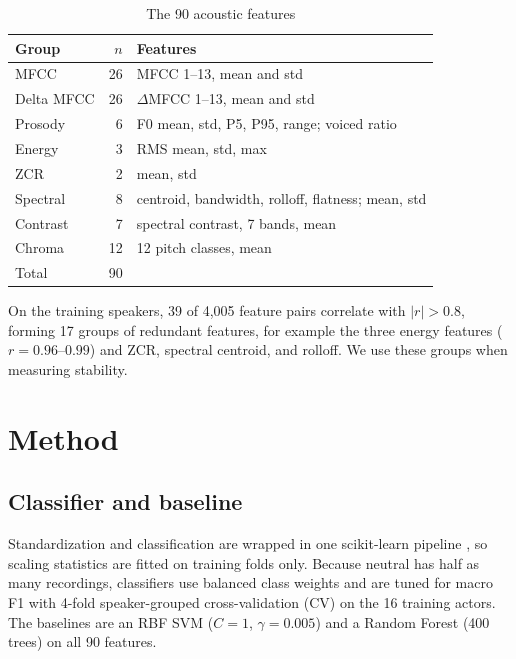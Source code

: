 \documentclass[conference]{IEEEtran}
\begin{document}
\begin{table}[t]
\caption{The 90 acoustic features}
\label{tab:features}
\centering
\small
\begin{tabular}{@{}lrl@{}}
\toprule
Group & $n$ & Features \\
\midrule
MFCC & 26 & MFCC 1--13, mean and std \\
Delta MFCC & 26 & $\Delta$MFCC 1--13, mean and std \\
Prosody & 6 & F0 mean, std, P5, P95, range; voiced ratio \\
Energy & 3 & RMS mean, std, max \\
ZCR & 2 & mean, std \\
Spectral & 8 & centroid, bandwidth, rolloff, flatness; mean, std \\
Contrast & 7 & spectral contrast, 7 bands, mean \\
Chroma & 12 & 12 pitch classes, mean \\
\midrule
Total & 90 & \\
\bottomrule
\end{tabular}
\end{table}

On the training speakers, 39 of 4{,}005 feature pairs correlate with $|r|>0.8$, forming 17
groups of redundant features, for example the three energy features ($r=0.96$--$0.99$) and ZCR,
spectral centroid, and rolloff. We use these groups when measuring stability.

\section{Method}

\subsection{Classifier and baseline}
Standardization and classification are wrapped in one scikit-learn pipeline
\cite{pedregosa2011sklearn}, so scaling statistics are fitted on training folds only. Because
neutral has half as many recordings, classifiers use balanced class weights and are tuned for
macro F1 with 4-fold speaker-grouped cross-validation (CV) on the 16 training actors. The baselines
are an RBF SVM ($C=1$, $\gamma=0.005$) and a Random Forest (400 trees) on all 90 features.
\end{document}
